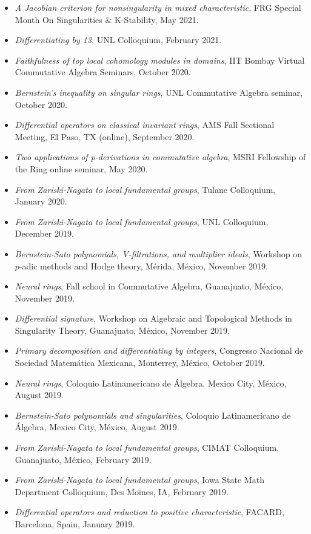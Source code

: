 \documentclass[12pt]{amsart}
\begin{document}
\begin{itemize}[leftmargin=9mm]
\item \emph{A Jacobian criterion for nonsingularity in mixed characteristic}, FRG Special Month On Singularities \& K-Stability, May 2021.
\item \emph{Differentiating by 13}, UNL Colloquium, February 2021.
	\item \emph{Faithfulness of top local cohomology modules in domains}, IIT Bombay Virtual Commutative Algebra Seminars,  October 2020.
	\item \emph{Bernstein's inequality on singular rings}, UNL Commutative Algebra seminar, October 2020.
	\item \emph{Differential operators on classical invariant rings}, AMS Fall Sectional Meeting, El Paso, TX (online), September 2020.
	\item \emph{Two applications of p-derivations in commutative algebra}, MSRI Fellowship of the Ring online seminar, May 2020.
	\item \emph{From Zariski-Nagata to local fundamental groups}, Tulane Colloquium, January 2020.
	\item \emph{From Zariski-Nagata to local fundamental groups}, UNL Colloquium, December 2019.
	\item \emph{Bernstein-Sato polynomials, V-filtrations, and multiplier ideals}, Workshop on $p$-adic methods and Hodge theory, M\'erida, M\'exico, November 2019.
\item \emph{Neural rings}, Fall school in Commutative Algebra, Guanajuato, M\'exico, November 2019.
\item \emph{Differential signature}, Workshop on Algebraic and Topological Methods in Singularity Theory, Guanajuato, M\'exico, November 2019.
	\item \emph{Primary decomposition and differentiating by integers}, Congresso Nacional de Sociedad Matem\'atica Mexicana, Monterrey, M\'exico, October 2019.
		\item \emph{Neural rings}, Coloquio Latinamericano de \'Algebra, Mexico City, M\'exico, August 2019.
	\item \emph{Bernstein-Sato polynomials and singularities}, Coloquio Latinamericano de \'Algebra, Mexico City, M\'exico, August 2019.
		\item \emph{From Zariski-Nagata to local fundamental groups}, CIMAT Colloquium, Guanajuato, M\'exico, February 2019.
	\item \emph{From Zariski-Nagata to local fundamental groups}, Iowa State Math Department Colloquium, Des Moines, IA, February 2019.
	\item \emph{Differential operators and reduction to positive characteristic}, FACARD, Barcelona, Spain, January 2019.	

\end{itemize}
\end{document}
